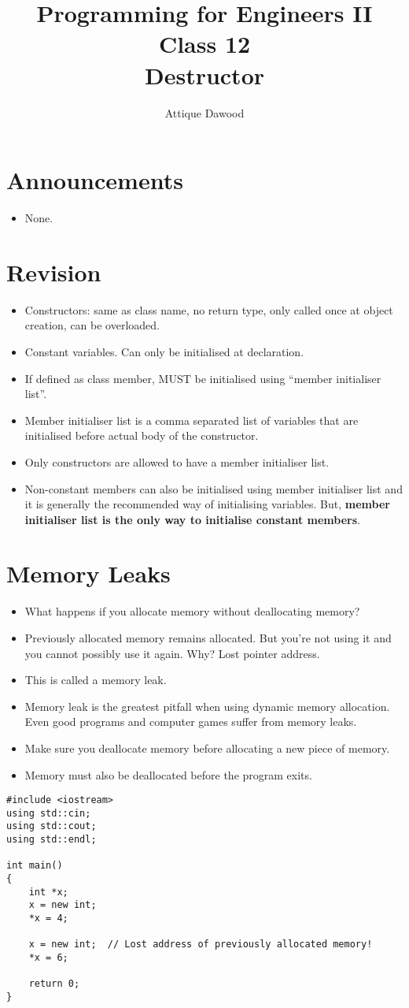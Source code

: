 \documentclass[12pt,a4paper]{article}
\title{\vspace{-2cm}Programming for Engineers II\\Class 12\\Destructor}
\author{Attique Dawood}
\begin{document}
\maketitle
\section{Announcements}
\begin{itemize}
\item None.
\end{itemize}
\section{Revision}
\begin{itemize}
\item Constructors: same as class name, no return type, only called once at object creation, can be overloaded.
\item Constant variables. Can only be initialised at declaration.
\item If defined as class member, MUST be initialised using ``member initialiser list''.
\item Member initialiser list is a comma separated list of variables that are initialised before actual body of the constructor.
\item Only constructors are allowed to have a member initialiser list.
\item Non-constant members can also  be initialised using member initialiser list and it is generally the recommended way of initialising variables. But, \textbf{member initialiser list is the only way to initialise constant members}.
\end{itemize}
\section{Memory Leaks}
\begin{itemize}
\item What happens if you allocate memory without deallocating memory?
\item Previously allocated memory remains allocated. But you're not using it and you cannot possibly use it again. Why? Lost pointer address.
\item This is called a memory leak.
\item Memory leak is the greatest pitfall when using dynamic memory allocation. Even good programs and computer games suffer from memory leaks.
\item Make sure you deallocate memory before allocating a new piece of memory.
\item Memory must also be deallocated before the program exits.
\end{itemize}
\begin{lstlisting}[caption={Typical Memory Leak}]
#include <iostream>
using std::cin;
using std::cout;
using std::endl;

int main()
{
	int *x;
	x = new int;
	*x = 4;

	x = new int;  // Lost address of previously allocated memory!
	*x = 6;
	
	return 0;
}
\end{lstlisting}
\end{document}
